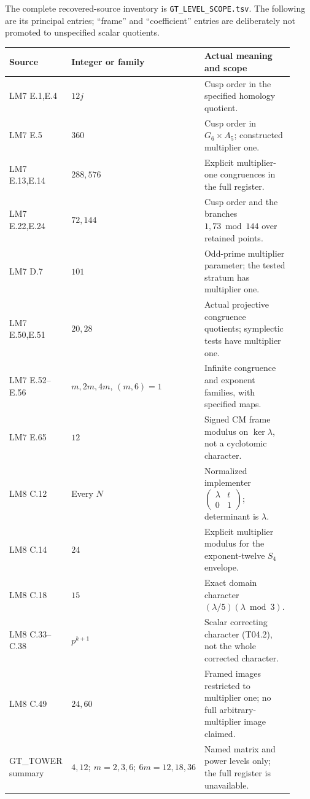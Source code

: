 \documentclass[11pt,a4paper]{article}
\begin{document}
The complete recovered-source inventory is
\texttt{GT\_LEVEL\_SCOPE.tsv}. The following are its principal entries;
``frame'' and ``coefficient'' entries are deliberately not promoted
to unspecified scalar quotients.
\begin{center}
\begin{tabular}{p{0.24\linewidth}p{0.23\linewidth}p{0.45\linewidth}}
\hline
Source & Integer or family & Actual meaning and scope\\\hline
LM7 E.1,E.4 & $12j$ & Cusp order in the specified homology quotient.\\
LM7 E.5 & $360$ & Cusp order in $G_6\times A_5$; constructed multiplier one.\\
LM7 E.13,E.14 & $288,576$ & Explicit multiplier-one congruences in the full register.\\
LM7 E.22,E.24 & $72,144$ & Cusp order and the branches $1,73\bmod144$ over retained points.\\
LM7 D.7 & $101$ & Odd-prime multiplier parameter; the tested stratum has multiplier one.\\
LM7 E.50,E.51 & $20,28$ & Actual projective congruence quotients; symplectic tests have multiplier one.\\
LM7 E.52--E.56 & $m,2m,4m$, $(m,6)=1$ & Infinite congruence and exponent families, with specified maps.\\
LM7 E.65 & $12$ & Signed CM frame modulus on $\ker\lambda$, not a cyclotomic character.\\
LM8 C.12 & Every $N$ & Normalized implementer $\left(\begin{smallmatrix}\lambda&t\\0&1\end{smallmatrix}\right)$; determinant is $\lambda$.\\
LM8 C.14 & $24$ & Explicit multiplier modulus for the exponent-twelve $S_4$ envelope.\\
LM8 C.18 & $15$ & Exact domain character $(\lambda/5)(\lambda\bmod3)$.\\
LM8 C.33--C.38 & $p^{k+1}$ & Scalar correcting character (T04.2), not the whole corrected character.\\
LM8 C.49 & $24,60$ & Framed images restricted to multiplier one; no full arbitrary-multiplier image claimed.\\
GT\_TOWER summary & $4,12;\ m=2,3,6;\ 6m=12,18,36$ & Named matrix and power levels only; the full register is unavailable.\\\hline
\end{tabular}
\end{center}
\end{document}
